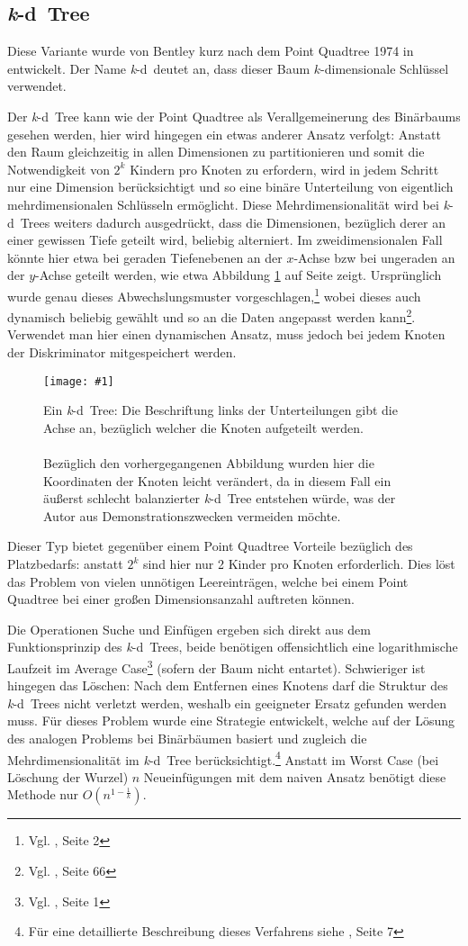 \documentclass[%
			paper=a4,%
			DIV12,
			liststotoc,
			bibtotoc,
			draft=false,%
			titlepage
			]{scrartcl}
\newcommand{\zit}[3]{#1 \cite{#2}, #3}
\newcommand{\footzit}[3]{\footnote{\zit{#1}{#2}{#3}}}
\newcommand{\kd}{\mbox{\textit{k}-d}}
\newcommand{\myfig}[5] {
 \begin{figure}[tbph]
	 \centering
	 \texttt{[image: \#1]}
	 \caption[#4]{#5}
	 \label{fig:#2}
 \end{figure}
}
\begin{document}
\subsection{\kd\ Tree}
Diese Variante wurde von Bentley kurz nach dem Point Quadtree 1974 in \cite{Bentley:1975} entwickelt. Der Name \kd\ deutet an, dass dieser Baum $k$-dimensionale Schlüssel verwendet. 

Der \kd\ Tree kann wie der Point Quadtree als Verallgemeinerung des Binärbaums gesehen werden, hier wird hingegen ein etwas anderer Ansatz verfolgt:
Anstatt den Raum gleichzeitig in allen Dimensionen zu partitionieren und somit die Notwendigkeit von $2^k$ Kindern pro Knoten zu erfordern, wird in jedem Schritt nur eine Dimension berücksichtigt und so eine binäre Unterteilung von eigentlich mehrdimensionalen Schlüsseln ermöglicht.
Diese Mehrdimensionalität wird bei \kd\ Trees weiters dadurch ausgedrückt, dass die Dimensionen, bezüglich derer an einer gewissen Tiefe geteilt wird, beliebig alterniert.
Im zweidimensionalen Fall könnte hier etwa bei geraden Tiefenebenen an der $x$-Achse bzw bei ungeraden an der $y$-Achse geteilt werden, wie etwa Abbildung \ref{fig:kdtree} auf Seite \pageref{fig:kdtree} zeigt.
Ursprünglich wurde genau dieses Abwechslungsmuster vorgeschlagen,\footzit{Vgl.}{Bentley:1975}{Seite 2}
wobei dieses auch dynamisch beliebig gewählt und so an die Daten angepasst werden kann\footzit{Vgl.}{Samet90}{Seite 66}.
Verwendet man hier einen dynamischen Ansatz, muss jedoch bei jedem Knoten der Diskriminator mitgespeichert werden.

\myfig{img/kdtree-tree-full-trimmed}{kdtree}{width=.78\textwidth}{\kd\ Tree}{Ein \kd\ Tree: Die Beschriftung links der Unterteilungen gibt die Achse an, bezüglich welcher die Knoten aufgeteilt werden.
\\ \\
Bezüglich den vorhergegangenen Abbildung wurden hier die Koordinaten der Knoten leicht verändert, da in diesem Fall ein äußerst schlecht balanzierter \kd\ Tree entstehen würde, was der Autor aus Demonstrationszwecken vermeiden möchte.}

Dieser Typ bietet gegenüber einem Point Quadtree Vorteile bezüglich des Platzbedarfs:
anstatt $2^k$ sind hier nur 2 Kinder pro Knoten erforderlich. Dies löst das Problem von vielen unnötigen Leereinträgen, welche bei einem Point Quadtree bei einer großen Dimensionsanzahl auftreten können.

Die Operationen Suche und Einfügen ergeben sich direkt aus dem Funktionsprinzip des \kd\ Trees, beide benötigen offensichtlich eine logarithmische Laufzeit im Average Case\footzit{Vgl.}{Bentley:1975}{Seite 1} (sofern der Baum nicht entartet).
Schwieriger ist hingegen das Löschen:
Nach dem Entfernen eines Knotens darf die Struktur des \kd\ Trees nicht verletzt werden, weshalb ein geeigneter Ersatz gefunden werden muss.
Für dieses Problem wurde eine Strategie entwickelt, welche auf der Lösung des analogen Problems bei Binärbäumen basiert und zugleich die Mehrdimensionalität im \kd\ Tree berücksichtigt.\footzit{Für eine detaillierte Beschreibung dieses Verfahrens siehe}{Bentley:1975}{Seite 7} 
Anstatt im Worst Case (bei Löschung der Wurzel) $n$ Neueinfügungen mit dem naiven Ansatz benötigt diese Methode nur $O(n^{1-\frac{1}{k}})$.
\end{document}
